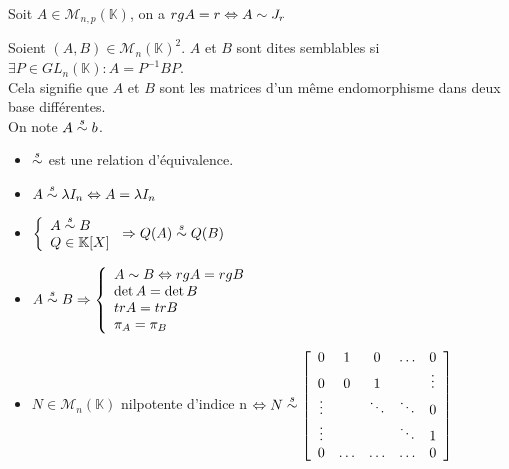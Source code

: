 \begin{prop} Soit $A\in\mathscr{M}_{n,p}(\mathbb{K})$, on a $rg A=r \Leftrightarrow A\sim J_r$
\end{prop}

\begin{defi} Soient $(A,B)\in\mathscr{M}_n(\mathbb{K})^2$. $A$ et $B$ sont dites semblables si $\exists P\in GL_n(\mathbb{K}): A = P^{-1}BP$. \\
    Cela signifie que $A$ et $B$ sont les matrices d'un même endomorphisme dans deux base différentes. \\
    On note $A\overset{s}{\sim} b$.
\end{defi}

\begin{prop}\begin{itemize}
    \item $\overset{s}{\sim}$ est une relation d'équivalence.
    \item $A\overset{s}{\sim}\lambda I_n \Leftrightarrow A=\lambda I_n$
    \item $\left\{\begin{array}{l} A\overset{s}{\sim} B \\ Q\in\mathbb{K}[X]\end{array}\right. \Rightarrow Q(A)\overset{s}{\sim} Q(B)$
    \item $A\overset{s}{\sim} B \Rightarrow \left\{\begin{array}{l} A\sim B \Leftrightarrow rg A= rg B \\
                                                       \det A = \det B \\
                                                       tr A = tr B \\
                                                       \pi_A = \pi_B
                                      \end{array}\right.$
    \item $N\in\mathscr{M}_n(\mathbb{K})$ nilpotente d'indice n $\Leftrightarrow N\overset{s}{\sim} \left[\begin{array}{ccccc} 0      & 1      & 0      & \ldots & 0      \\
                                                                                                        0      & 0      & 1      &        & \vdots \\
                                                                                                        \vdots &        & \ddots & \ddots & 0      \\
                                                                                                        \vdots &        &        & \ddots & 1      \\
                                                                                                        0      & \ldots & \ldots & \ldots & 0      \\
                                                                                    \end{array}\right]$
\end{itemize}\end{prop}

